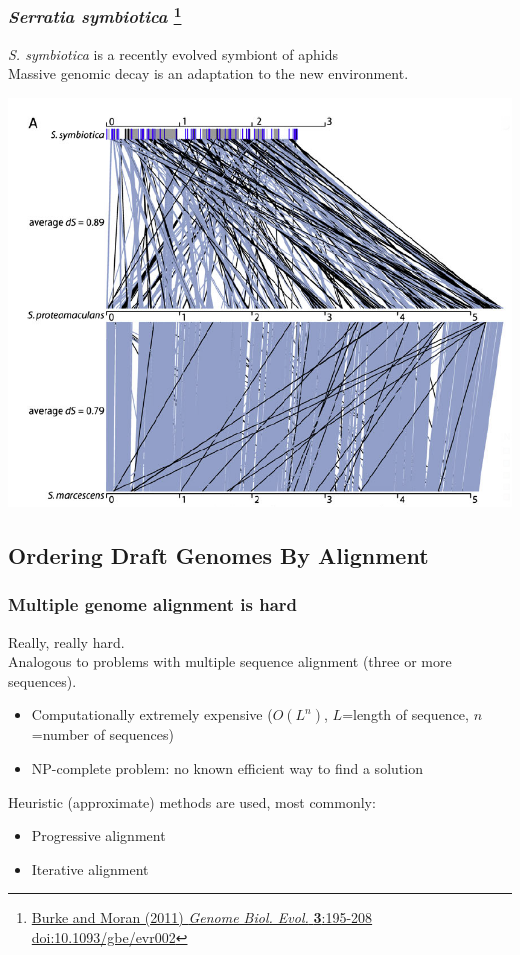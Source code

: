 \begin{frame}
  \frametitle{\textit{Serratia symbiotica} \footnote{\tiny{\href{http://dx.doi.org/10.1093/gbe/evr002}{Burke and Moran (2011) \textit{Genome Biol. Evol.} \textbf{3}:195-208 doi:10.1093/gbe/evr002}}}}
  \textit{S. symbiotica} is a recently evolved symbiont of aphids\\
  Massive genomic decay is an adaptation to the new environment.\\
  \begin{center}
    \includegraphics[width=0.75\textheight]{images/s_symbiotica}
  \end{center}    
\end{frame}

\subsection{Ordering Draft Genomes By Alignment}

\begin{frame}
  \frametitle{Multiple genome alignment is hard}
  Really, really hard.\\[0.2cm]
  Analogous to problems with multiple sequence alignment (three or more sequences).
  \begin{itemize}
    \item Computationally extremely expensive ($O(L^n)$, $L$=length of sequence, $n$=number of sequences) 
    \item NP-complete problem: no known efficient way to find a solution
  \end{itemize}
  Heuristic (approximate) methods are used, most commonly:
  \begin{itemize}
    \item Progressive alignment
    \item Iterative alignment
  \end{itemize}
\end{frame}

